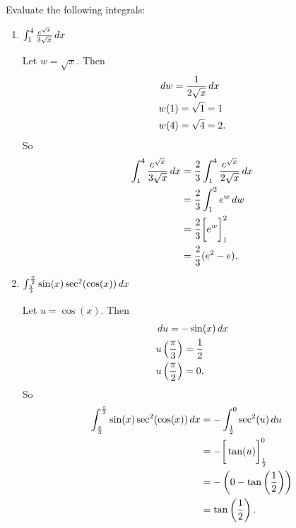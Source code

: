 \documentclass[handout,nooutcomes]{ximera}
\begin{document}
\begin{problem}
Evaluate the following integrals:

	\begin{enumerate}
	
	\item  $\int_1^4 \frac{e^{\sqrt{x}}}{3\sqrt{x}} \,d x$
		\begin{freeResponse}
		Let $w=\sqrt{x}$.  Then
			\begin{align*}
			&\,d w = \frac{1}{2 \sqrt{x}} \,d x  \\
			&w(1) = \sqrt{1} = 1  \\
			&w(4) = \sqrt{4} = 2.
			\end{align*}
		So
			\begin{align*}
			\int_1^4 \frac{e^{\sqrt{x}}}{3\sqrt{x}} \,d x &= \frac{2}{3} \int_1^4 \frac{e^{\sqrt{x}}}{2\sqrt{x}} \,d x  \\
			&= \frac{2}{3} \int_1^2 e^w \,d w  \\
			&= \frac{2}{3} \bigg[ e^w \bigg]_1^2  \\
			&= \frac{2}{3} (e^2 - e).
			\end{align*}
		\end{freeResponse}
		
		
		
	\item  $\int_{\frac{\pi}{3}}^{\frac{\pi}{2}} \sin(x) \sec^2(\cos(x)) \,d x$
		\begin{freeResponse}
		Let $u=\cos(x)$.  Then
			\begin{align*}
			&\,d u = -\sin(x) \,d x  \\
			&u\left( \frac{\pi}{3} \right) = \frac{1}{2}  \\
			&u\left( \frac{\pi}{2} \right) = 0.
			\end{align*}
		So
			\begin{align*}
			\int_{\frac{\pi}{3}}^{\frac{\pi}{2}} \sin(x) \sec^2(\cos(x)) \,d x &= - \int_{\frac{1}{2}}^0 \sec^2(u) \,d u   \\
			&= - \bigg[ \tan(u) \bigg]_{\frac{1}{2}}^0  \\
			&=  -\left( 0 - \tan\left( \frac{1}{2} \right) \right)  \\
			&= \tan \left( \frac{1}{2} \right).
			\end{align*}
		\end{freeResponse}
		
		
		
	\end{enumerate}
			
			
	
\end{problem}
\end{document}
